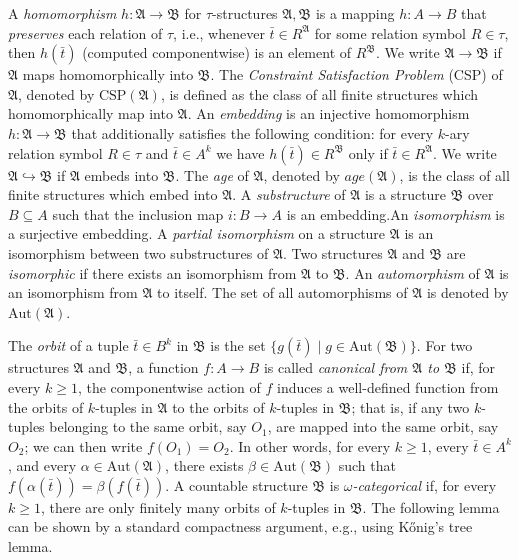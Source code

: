 \documentclass[oneside,reqno,12pt]{amsart}
\theoremstyle{plain}
\theoremstyle{remark}
\newcommand{\struct}[1]{\mathfrak{#1}}
\newcommand{\CSP}{\ensuremath{\mathrm{CSP}}\xspace}
\newcommand{\age}{\ensuremath{\mathit{age}}\xspace}
\newcommand{\Aut}{\ensuremath{\mathrm{Aut}}\xspace}
\begin{document}
{A \emph{homomorphism} $h\colon \struct{A} \rightarrow \struct{B}$ for $\tau$-structures $\struct{A},\struct{B}$ is a mapping $h\colon  A\rightarrow B$ that \emph{preserves} each relation of $\tau$, i.e., whenever $ \bar{t} \in R^{\struct{A}}$ for some relation symbol $R\in \tau$, then $h(\bar{t})$ (computed componentwise) 
 is an element of $R^{\struct{B}}$.
We write $\struct{A} \rightarrow \struct{B}$ if $\struct{A}$ maps homomorphically into $\struct{B}$. 
The \emph{Constraint Satisfaction Problem} (CSP) of $\struct{A}$, denoted by $\CSP(\struct{A})$, is defined as the class of all finite structures which homomorphically map into $\struct{A}$.
An \emph{embedding} 
is an injective homomorphism $h\colon \struct{A} \rightarrow \struct{B}$ that additionally satisfies the following condition: for every $k$-ary relation symbol $R\in \tau$ and $\bar{t}\in A^{k}$ we have $h(\bar{t})\in R^{\struct{B}}$ only if $\bar{t}\in R^{\struct{A}}.$
We write $\struct{A}\hookrightarrow \struct{B}$ if $\struct{A}$ embeds into $\struct{B}$. 
The \emph{age} of $\struct{A}$, denoted by $\age(\struct{A})$, is the class of all finite structures which embed into $\struct{A}$.
A \emph{substructure} of $\struct{A}$ is a structure $\struct{B}$ over $B\subseteq A$ such that the inclusion map $i\colon B\rightarrow A$ is an embedding.An \emph{isomorphism} is a surjective embedding. 
A \emph{partial isomorphism} on a structure $\struct{A}$ is an isomorphism between two substructures of $\struct{A}$.
Two structures $\struct{A}$ and $\struct{B}$ are \emph{isomorphic} if there exists an isomorphism from $\struct{A} $ to $\struct{B}$.  An \emph{automorphism} of $\struct{A}$ is an isomorphism from $\struct{A}$ to itself.  
The set of all automorphisms of $\struct{A}$ is denoted by $\Aut(\struct{A})$.

The \emph{orbit} of a tuple $\bar{t}\in B^{k}$ in $\struct{B}$ is the set $\{g(\bar{t}) \mid g \in \Aut(\struct{B})\}.$ 
For two structures $\struct{A}$ and $\struct{B}$, a function $f\colon A \rightarrow B$ is called \emph{canonical from $\struct{A}$ to $\struct{B}$} if, for every $k\geq 1$, the componentwise action of $f$ induces a well-defined function from the orbits of $k$-tuples in $\struct{A}$ to the orbits of $k$-tuples in $\struct{B}$; that is, if any two $k$-tuples belonging to the  same orbit, say $O_1$, are mapped into the same orbit, say $O_2$; we can then write $f(O_1) = O_2$.
In other words, for every $k\geq 1$,  every $\bar{t}\in A^k$,  and every $\alpha\in\Aut(\struct{A})$, there exists $\beta\in\Aut(\struct{B})$ such that $f(\alpha(\bar{t}))=\beta(f(\bar{t}))$.
A countable structure $\struct{B}$ is \emph{$\omega$-categorical} if, for every $k\geq 1$, there are only finitely many orbits of $k$-tuples in $\struct{B}$. 
The following lemma can be shown by a  standard compactness argument, e.g., using K\H{o}nig's tree lemma.

}
\end{document}
